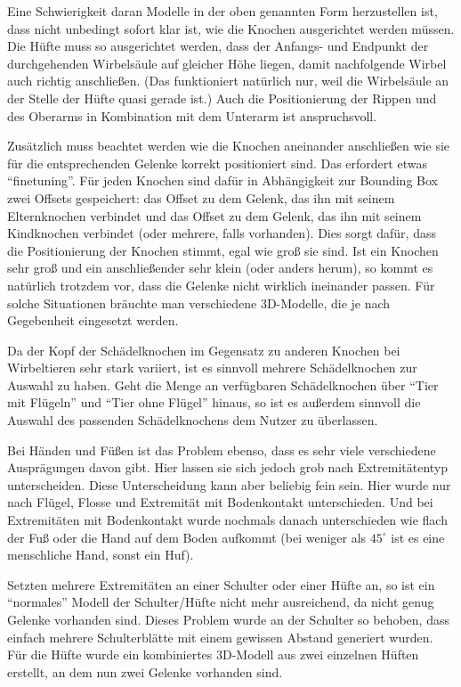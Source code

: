 Eine Schwierigkeit daran Modelle in der oben genannten Form herzustellen ist, dass nicht unbedingt sofort klar ist, wie die Knochen ausgerichtet werden müssen. Die Hüfte muss \zb so ausgerichtet werden, dass der Anfangs- und Endpunkt der durchgehenden Wirbelsäule auf gleicher Höhe liegen, damit nachfolgende Wirbel auch richtig anschließen. (Das funktioniert natürlich nur, weil die Wirbelsäule an der Stelle der Hüfte quasi gerade ist.)
Auch die Positionierung der Rippen und des Oberarms in Kombination mit dem Unterarm ist anspruchsvoll. 

Zusätzlich muss beachtet werden wie die Knochen aneinander anschließen \bzw wie sie für die entsprechenden Gelenke korrekt positioniert sind. Das erfordert etwas "`finetuning"'. Für jeden Knochen sind dafür in Abhängigkeit zur Bounding Box zwei Offsets gespeichert: das Offset zu dem Gelenk, das ihn mit seinem Elternknochen verbindet und das Offset zu dem Gelenk, das ihn mit seinem Kindknochen verbindet (oder mehrere, falls vorhanden). Dies sorgt dafür, dass die Positionierung der Knochen stimmt, egal wie groß sie sind. Ist ein Knochen sehr groß und ein anschließender sehr klein (oder anders herum), so kommt es natürlich trotzdem vor, dass die Gelenke nicht wirklich ineinander passen. Für solche Situationen bräuchte man verschiedene 3D-Modelle, die je nach Gegebenheit eingesetzt werden.

Da der Kopf \bzw der Schädelknochen im Gegensatz zu anderen Knochen bei Wirbeltieren sehr stark variiert, ist es sinnvoll mehrere Schädelknochen zur Auswahl zu haben. Geht die Menge an verfügbaren Schädelknochen über "`Tier mit Flügeln"' und "`Tier ohne Flügel"' hinaus, so ist es außerdem sinnvoll die Auswahl des passenden Schädelknochens dem Nutzer zu überlassen.

Bei Händen und Füßen ist das Problem ebenso, dass es sehr viele verschiedene Ausprägungen davon gibt. Hier lassen sie sich jedoch grob nach Extremitätentyp unterscheiden. Diese Unterscheidung kann aber beliebig fein sein. Hier wurde nur nach Flügel, Flosse  und Extremität mit Bodenkontakt unterschieden. Und bei Extremitäten mit Bodenkontakt wurde nochmals danach unterschieden wie flach der Fuß oder die Hand auf dem Boden aufkommt (bei weniger als $45^\circ$ ist es eine menschliche Hand, sonst ein Huf). 

Setzten mehrere Extremitäten an einer Schulter oder einer Hüfte an, so ist ein "`normales"' Modell der Schulter/Hüfte nicht mehr ausreichend, da nicht genug Gelenke vorhanden sind. Dieses Problem wurde an der Schulter so behoben, dass einfach mehrere Schulterblätte mit einem gewissen Abstand generiert wurden. Für die Hüfte wurde ein kombiniertes 3D-Modell aus zwei einzelnen Hüften erstellt, an dem nun zwei Gelenke vorhanden sind.


